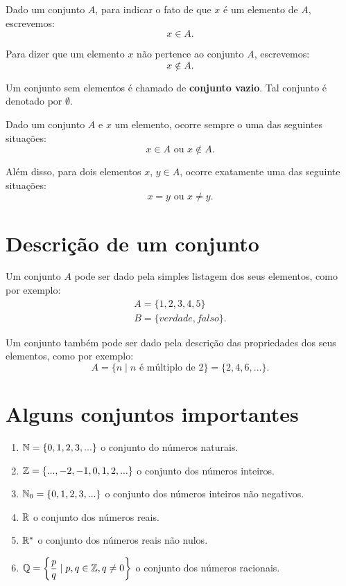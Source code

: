 Dado um conjunto $A$, para indicar o fato de que $x$ {\'e} um elemento de $A$, escrevemos:
\[
x \in A.
\]

Para dizer que um elemento $x$ n{\~a}o pertence ao conjunto $A$, escrevemos:
\[
x \notin A.
\]

Um conjunto sem elementos {\'e} chamado de \textbf{conjunto vazio}. Tal conjunto {\'e} denotado por $\emptyset$.

Dado um conjunto $A$ e $x$ um elemento, ocorre sempre o uma das seguintes situa\c{c}\~oes:
\[
x \in A \mbox{ ou } x \notin A.
\]

Al{\'e}m disso, para dois elementos $x$, $y \in A$, ocorre exatamente uma das seguinte situa\c{c}\~oes:
\[
x = y \mbox{ ou } x \neq y.
\]

\section{Descri{\c c}{\~a}o de um conjunto}

Um conjunto $A$ pode ser dado pela simples listagem dos seus elementos, como por exemplo:
\begin{align*}
	A= \{1,2,3,4,5\}\\
	B = \{verdade, falso\}.
\end{align*}

Um conjunto tamb{\'e}m pode ser dado pela descri{\c c}{\~a}o das propriedades dos seus elementos, como por exemplo:
\[
A = \{n \mid n \mbox{ \'e m{\'u}ltiplo de } 2\} = \{2,4,6,...\}.
\]

\section{Alguns conjuntos importantes}
\begin{enumerate}
\item $\mathbb{N} = \{0,1,2,3,...\}$ o conjunto do n{\'u}meros naturais.
\item $\mathbb{Z} = \{...,-2,-1,0,1,2,...\}$ o conjunto dos n{\'u}meros inteiros.
\item $\mathbb{N}_0 = \{0,1,2,3,...\}$ o conjunto dos n{\'u}meros inteiros n{\~a}o negativos.
\item $\mathbb{R} $ o conjunto dos n{\'u}meros reais.
\item $\mathbb{R}^*$ o conjunto dos n{\'u}meros reais n{\~a}o nulos.
\item $\mathbb{Q} = \left\{\dfrac{p}{q} \mid p,q \in \mathbb{Z}, q \neq 0 \right\}$ o conjunto dos n{\'u}meros racionais.
\end{enumerate}

